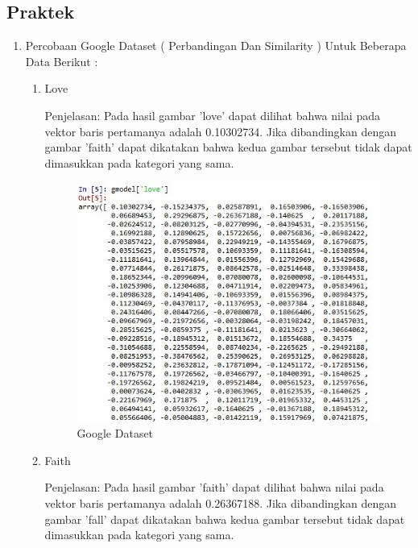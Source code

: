 \subsection{Praktek}
\begin{enumerate}
\item Percobaan Google Dataset ( Perbandingan Dan Similarity ) Untuk Beberapa Data Berikut :
\begin{enumerate}
\item Love

Penjelasan: Pada hasil gambar 'love' dapat dilihat bahwa nilai pada vektor baris pertamanya adalah 0.10302734. Jika dibandingkan dengan gambar 'faith' dapat dikatakan bahwa kedua gambar tersebut tidak dapat dimasukkan pada kategori yang sama.

\begin{figure}[H]
\centering
\includegraphics[scale=0.7]{figures/1174051/5/12love.jpg}
\caption{Google Dataset}
\label{Google Dataset}
\end{figure}

\item Faith

Penjelasan: Pada hasil gambar 'faith' dapat dilihat bahwa nilai pada vektor baris pertamanya adalah 0.26367188. Jika dibandingkan dengan gambar 'fall' dapat dikatakan bahwa kedua gambar tersebut tidak dapat dimasukkan pada kategori yang sama.


\end{enumerate}
\end{enumerate}
